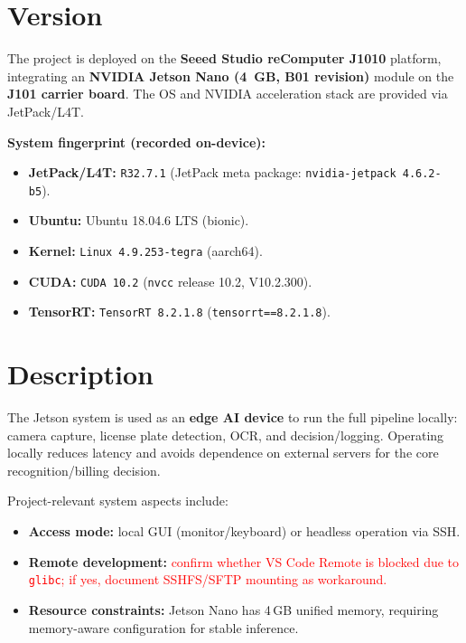 \providecommand{\TBD}[1]{\textcolor{red}{#1}}

\section{Version}
\noindent
The project is deployed on the \textbf{Seeed Studio reComputer J1010} platform, integrating an \textbf{NVIDIA Jetson Nano (4~GB, B01 revision)} module on the \textbf{J101 carrier board}.
The OS and NVIDIA acceleration stack are provided via JetPack/L4T.

\vspace{1mm}
\noindent
\textbf{System fingerprint (recorded on-device):}
\begin{itemize}
	\item \textbf{JetPack/L4T:} \texttt{R32.7.1} (JetPack meta package: \texttt{nvidia-jetpack 4.6.2-b5}).
	\item \textbf{Ubuntu:} Ubuntu 18.04.6 LTS (bionic).
	\item \textbf{Kernel:} \texttt{Linux 4.9.253-tegra} (aarch64).
	\item \textbf{CUDA:} \texttt{CUDA 10.2} (\texttt{nvcc} release 10.2, V10.2.300).
	\item \textbf{TensorRT:} \texttt{TensorRT 8.2.1.8} (\texttt{tensorrt==8.2.1.8}).
\end{itemize}

\section{Description}
\noindent
The Jetson system is used as an \textbf{edge AI device} to run the full pipeline locally: camera capture, license plate detection, OCR, and decision/logging.
Operating locally reduces latency and avoids dependence on external servers for the core recognition/billing decision.

\vspace{1mm}
\noindent
Project-relevant system aspects include:
\begin{itemize}
	\item \textbf{Access mode:} local GUI (monitor/keyboard) or headless operation via SSH.
	\item \textbf{Remote development:} \TBD{confirm whether VS Code Remote is blocked due to \texttt{glibc}; if yes, document SSHFS/SFTP mounting as workaround.}
	\item \textbf{Resource constraints:} Jetson Nano has 4\,GB unified memory, requiring memory-aware configuration for stable inference.
\end{itemize}

